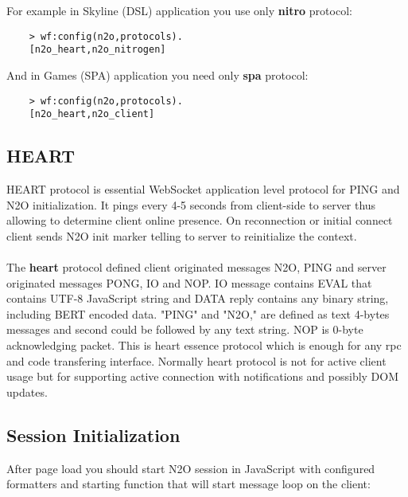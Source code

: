 For example in Skyline (DSL) application you use only {\bf nitro} protocol:

\vspace{1\baselineskip}
\begin{lstlisting}
    > wf:config(n2o,protocols).
    [n2o_heart,n2o_nitrogen]
\end{lstlisting}
\vspace{1\baselineskip}

And in Games (SPA) application you need only {\bf spa} protocol:

\vspace{1\baselineskip}
\begin{lstlisting}
    > wf:config(n2o,protocols).
    [n2o_heart,n2o_client]
\end{lstlisting}
\vspace{1\baselineskip}

\newpage
\subsection{HEART}

HEART protocol is essential WebSocket application level protocol for PING and N2O initialization.
It pings every 4-5 seconds from client-side to server thus allowing to
determine client online presence. On reconnection or initial connect
client sends N2O init marker telling to server to reinitialize the context.

\paragraph{}
The {\bf heart} protocol defined client originated messages N2O, PING
and server originated messages PONG, IO and NOP. IO message contains EVAL
that contains UTF-8 JavaScript string and DATA reply contains any
binary string, including BERT encoded data. "PING" and "N2O," are
defined as text 4-bytes messages and second could be followed by
any text string. NOP is 0-byte acknowledging packet.
This is heart essence protocol which is enough for any rpc and code
transfering interface. Normally heart protocol is not for active
client usage but for supporting active connection with notifications
and possibly DOM updates.

\subsection*{Session Initialization}

After page load you should start N2O session in JavaScript with configured
formatters and starting function that will start message loop on the client:

